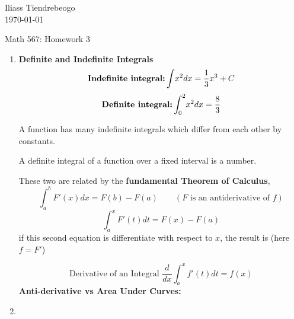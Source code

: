 \documentclass{article}[12pt]
\begin{document}
\hfill Iliass Tiendrebeogo\\

\hfill \today\\

\bigskip

\begin{center}
  \begin{Large}
    Math 567: Homework 3 \\
    
   
  \end{Large}
\end{center} 


\begin{enumerate}[1.]
\item  %
{\bf Definite and Indefinite Integrals}
$$\text{\bf Indefinite integral:} \int \! x^2 dx = \frac{1}{3}x^3 + C$$
$$\text{\bf Definite integral:} \int_0^2 \! x^2 dx = \frac{8}{3}$$

A function has many indefinite integrals which differ from each other by constants.

A definite integral of a function over a fixed interval is a number.

These two are related by the {\bf fundamental Theorem of Calculus},
$$ \int_a^b \! F'(x) dx = F(b)-F(a) \qquad(F \text{ is an antiderivative of } f)$$
$$ \int_a^x \! F'(t) dt = F(x)-F(a)$$
if this second equation is differentiate with respect to $x$, the result is (here $f=F'$)

$$ \text{Derivative of an Integral } \frac{d}{dx}\int_a^x \! f'(t) dt = f(x)$$
{\bf Anti-derivative vs Area Under Curves:}

\item 

\end{enumerate}
\end{document}
